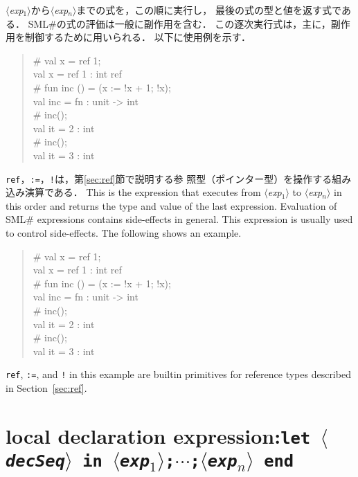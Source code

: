 \documentclass{jbook}
\newcommand{\txt}[2]{#2}
\newcommand{\smlsharp}{SML\#}
\newcommand{\code}[1]{\mbox{\large\tt #1}}
\newcommand{\nonterm}[1]{\mbox{$\langle$}{\it #1}\mbox{$\rangle$}}
\newcommand{\term}[1]{\mbox{{\tt #1}}}
\newenvironment{program}{\begin{quote}\begin{tt}}%
                        {\end{tt}\end{quote}}
\begin{document}
\ifjp%
	\nonterm{exp$_1$}から\nonterm{exp$_n$}までの式を，この順に実行し，
最後の式の型と値を返す式である．
	\smlsharp{}の式の評価は一般に副作用を含む．
	この逐次実行式は，主に，副作用を制御するために用いられる．
	以下に使用例を示す．
\begin{program}
\# val x = ref 1;
\\
val x = ref 1 : int ref
\\
\# fun inc () = (x := !x + 1; !x);
\\
val inc = fn : unit -> int
\\
\# inc();
\\
val it = 2 : int
\\
\# inc();
\\
val it = 3 : int
\end{program}
	\code{ref}，\code{:=}，\code{!}は，第\ref{sec:ref}節で説明する参
照型（ポインター型）を操作する組み込み演算である．
\else%
	This is the expression that executes
from \nonterm{exp$_1$} to \nonterm{exp$_n$} in this order
and returns the type and value of the last expression.
	Evaluation of \smlsharp{} expressions contains side-effects in
general.
	This expression is usually used to control side-effects.
	The following shows an example.

\begin{program}
\# val x = ref 1;
\\
val x = ref 1 : int ref
\\
\# fun inc () = (x := !x + 1; !x);
\\
val inc = fn : unit -> int
\\
\# inc();
\\
val it = 2 : int
\\
\# inc();
\\
val it = 3 : int
\end{program}
	\code{ref}, \code{:=}, and \code{!} in this example are
builtin primitives for reference types described in
Section~\ref{sec:ref}.

\fi%


\section{\txt{局所宣言式}{local declaration expression}:\term{let\ \nonterm{decSeq}\ in\ \nonterm{exp$_1$};$\cdots$;\nonterm{exp$_n$} end}}
\end{document}
